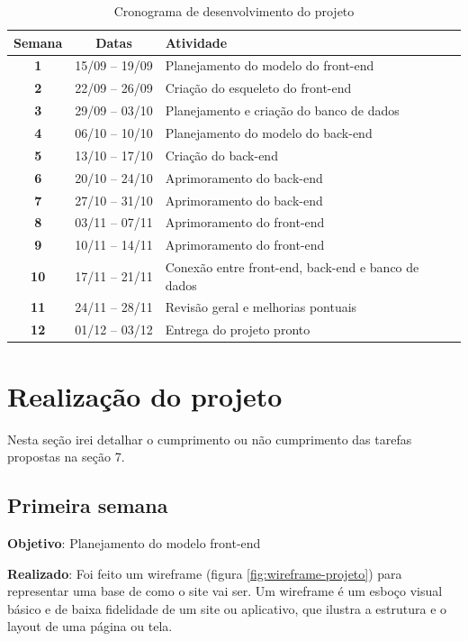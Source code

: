 \documentclass[a4paper]{abntex2}
\begin{document}
\begin{table}[h!]
\centering
\renewcommand{\arraystretch}{1.3} %
\begin{tabularx}{\textwidth}{>{\bfseries}c c X}
\toprule
Semana & Datas & Atividade \\
\midrule
1  & 15/09 -- 19/09 & Planejamento do modelo do front-end \\
2  & 22/09 -- 26/09 & Criação do esqueleto do front-end \\
3  & 29/09 -- 03/10 & Planejamento e criação do banco de dados \\
4  & 06/10 -- 10/10 & Planejamento do modelo do back-end \\
5  & 13/10 -- 17/10 & Criação do back-end \\
6  & 20/10 -- 24/10 & Aprimoramento do back-end \\
7  & 27/10 -- 31/10 & Aprimoramento do back-end \\
8  & 03/11 -- 07/11 & Aprimoramento do front-end \\
9  & 10/11 -- 14/11 & Aprimoramento do front-end \\
10 & 17/11 -- 21/11 & Conexão entre front-end, back-end e banco de dados \\
11 & 24/11 -- 28/11 & Revisão geral e melhorias pontuais \\
12 & 01/12 -- 03/12 & Entrega do projeto pronto \\
\bottomrule
\end{tabularx}
\caption{Cronograma de desenvolvimento do projeto}
\end{table}

\section{Realização do projeto}

Nesta seção irei detalhar o cumprimento ou não cumprimento das tarefas propostas na seção 7.

\subsection{Primeira semana}

\textbf{Objetivo}: Planejamento do modelo front-end

\textbf{Realizado}: Foi feito um wireframe (figura \ref{fig:wireframe-projeto}) para representar uma base de como o site vai ser. Um wireframe é um esboço visual básico e de baixa fidelidade de um site ou aplicativo, que ilustra a estrutura e o layout de uma página ou tela.
\end{document}
